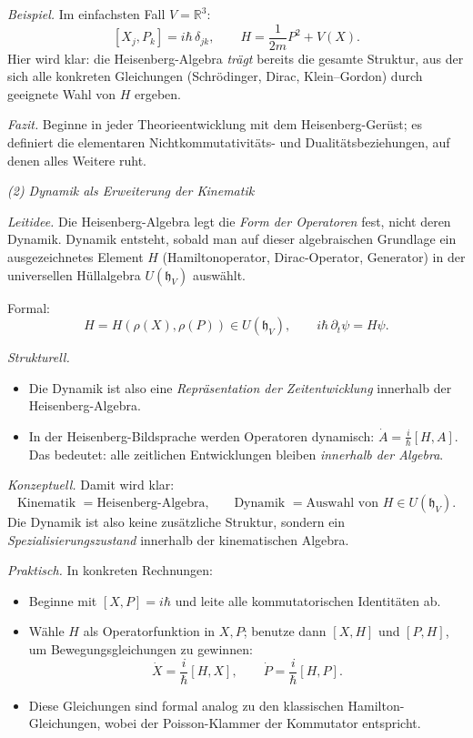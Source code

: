 \documentclass[10pt, letterpaper]{article}
\newcommand{\R}{\mathbb{R}}
\begin{document}
\emph{Beispiel.}
Im einfachsten Fall \(V=\R^3\):
\[
[X_j,P_k] = i\hbar\,\delta_{jk},\qquad
H=\frac{1}{2m}P^2+V(X).
\]
Hier wird klar: die Heisenberg-Algebra \emph{trägt} bereits die gesamte Struktur,
aus der sich alle konkreten Gleichungen (Schrödinger, Dirac, Klein–Gordon)
durch geeignete Wahl von \(H\) ergeben.

\emph{Fazit.}
Beginne in jeder Theorieentwicklung mit dem Heisenberg-Gerüst;
es definiert die elementaren Nichtkommutativitäts- und Dualitätsbeziehungen,
auf denen alles Weitere ruht.


\emph{(2) Dynamik als Erweiterung der Kinematik}

\emph{Leitidee.}
Die Heisenberg-Algebra legt die \emph{Form der Operatoren} fest,
nicht deren Dynamik.
Dynamik entsteht, sobald man auf dieser algebraischen Grundlage
ein ausgezeichnetes Element \(H\) (Hamiltonoperator, Dirac-Operator, Generator)
in der universellen Hüllalgebra \(U(\mathfrak{h}_V)\) auswählt.

Formal:
\[
H = H(\rho(X),\rho(P)) \in U(\mathfrak{h}_V),\qquad
i\hbar\,\partial_t\psi = H\psi.
\]

\emph{Strukturell.}
\begin{itemize}
\item Die Dynamik ist also eine \emph{Repräsentation der Zeitentwicklung}
      innerhalb der Heisenberg-Algebra.
\item In der Heisenberg-Bildsprache werden Operatoren dynamisch:
      \(\dot{A} = \frac{i}{\hbar}[H,A]\).
      Das bedeutet: alle zeitlichen Entwicklungen bleiben \emph{innerhalb der Algebra}.
\end{itemize}

\emph{Konzeptuell.}
Damit wird klar:
\[
\text{Kinematik } = \text{Heisenberg-Algebra,} \qquad
\text{Dynamik } = \text{Auswahl von } H\in U(\mathfrak{h}_V).
\]
Die Dynamik ist also keine zusätzliche Struktur,
sondern ein \emph{Spezialisierungszustand} innerhalb der kinematischen Algebra.

\emph{Praktisch.}
In konkreten Rechnungen:
\begin{itemize}
\item Beginne mit \([X,P]=i\hbar\) und leite alle kommutatorischen Identitäten ab.
\item Wähle \(H\) als Operatorfunktion in \(X,P\);
      benutze dann \([X,H]\) und \([P,H]\), um Bewegungsgleichungen zu gewinnen:
      \[
      \dot{X} = \frac{i}{\hbar}[H,X],\qquad \dot{P} = \frac{i}{\hbar}[H,P].
      \]
\item Diese Gleichungen sind formal analog zu den klassischen Hamilton-Gleichungen,
      wobei der Poisson-Klammer der Kommutator entspricht.
\end{itemize}
\end{document}
